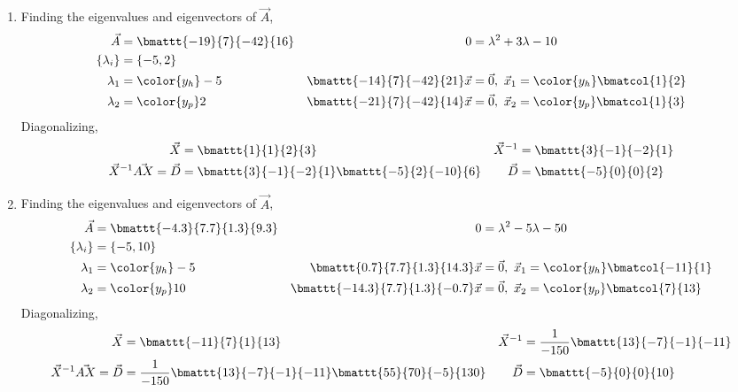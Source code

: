 \begin{enumerate}
    \item Finding the eigenvalues and eigenvectors of $ \vec{A} $,
          \begin{align}
              \vec{A}                          & = \bmattt{-19}{7}{-42}{16} &
              0                                & = \lambda^2 + 3\lambda -10   \\
              \{\lambda_i\}                    & = \{-5, 2\}                  \\
              \lambda_1                        & = \color{y_h} -5           &
              \bmattt{-14}{7}{-42}{21} \vec{x} & = \vec{0},\
              \vec{x}_1 = \color{y_h} \bmatcol{1}{2}                          \\
              \lambda_2                        & = \color{y_p} 2            &
              \bmattt{-21}{7}{-42}{14} \vec{x} & = \vec{0},\
              \vec{x}_2 = \color{y_p} \bmatcol{1}{3}
          \end{align}
          Diagonalizing,
          \begin{align}
              \vec{X}                        & = \bmattt{1}{1}{2}{3}   &
              \vec{X}^{-1}                   & = \bmattt{3}{-1}{-2}{1}   \\
              \vec{X}^{-1}\vec{AX} = \vec{D} & = \bmattt{3}{-1}{-2}{1}
              \bmattt{-5}{2}{-10}{6}         &
              \vec{D}                        & = \bmattt{-5}{0}{0}{2}
          \end{align}

    \item Finding the eigenvalues and eigenvectors of $ \vec{A} $,
          \begin{align}
              \vec{A}                                & = \bmattt{-4.3}{7.7}{1.3}{9.3} &
              0                                      & = \lambda^2 - 5\lambda - 50      \\
              \{\lambda_i\}                          & = \{-5, 10\}                     \\
              \lambda_1                              & = \color{y_h} -5               &
              \bmattt{0.7}{7.7}{1.3}{14.3} \vec{x}   & = \vec{0},\
              \vec{x}_1 = \color{y_h} \bmatcol{-11}{1}                                  \\
              \lambda_2                              & = \color{y_p} 10               &
              \bmattt{-14.3}{7.7}{1.3}{-0.7} \vec{x} & = \vec{0},\
              \vec{x}_2 = \color{y_p} \bmatcol{7}{13}
          \end{align}
          Diagonalizing,
          \begin{align}
              \vec{X}                        & = \bmattt{-11}{7}{1}{13} &
              \vec{X}^{-1}                   & = \frac{1}{-150}
              \bmattt{13}{-7}{-1}{-11}                                    \\
              \vec{X}^{-1}\vec{AX} = \vec{D} & = \frac{1}{-150}
              \bmattt{13}{-7}{-1}{-11}
              \bmattt{55}{70}{-5}{130}       &
              \vec{D}                        & = \bmattt{-5}{0}{0}{10}
          \end{align}


\end{enumerate}
